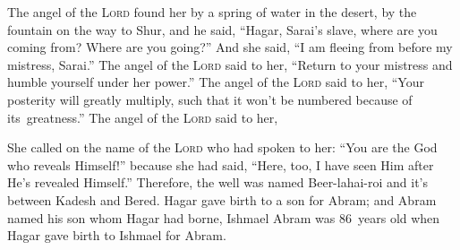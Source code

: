 \begin{inparaenum}
   The angel of the \textsc{Lord} found her by a spring of water in the desert, by the fountain on the way to Shur,%
   and he said, ``Hagar, Sarai's slave, where are you coming from? Where are you going?'' And she said, ``I am fleeing from before my mistress, Sarai.''%
   The angel of the \textsc{Lord} said to her, ``Return to your mistress and humble yourself under her power.'' %
   The angel of the \textsc{Lord} said to her, ``Your posterity will greatly multiply, such that it won't be numbered because of its\understood\ greatness.''%
   The angel of the \textsc{Lord} said to her,%
  
  
  
  
  
  {\noindent{} She called on the name of the \textsc{Lord} who had spoken to her: ``You are the God who reveals Himself!'' because she had said, ``Here, too, I have seen Him after He's revealed Himself.''}%
   Therefore, the well was named Beer-lahai-roi and it's between Kadesh and Bered.%
   Hagar gave birth to a son for Abram; and Abram named his son whom Hagar had borne, Ishmael%
   Abram was 86~years old when Hagar gave birth to Ishmael for Abram.%
\end{inparaenum}

